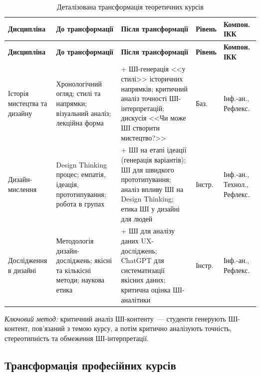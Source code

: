 \begin{longtable}{@{}p{}p{}p{}p{}p{}@{}}
\caption{Деталізована трансформація теоретичних курсів}\label{tab:app-theory} \\
\hline
\textbf{Дисципліна} & \textbf{До трансформації} & \textbf{Після трансформації} & \textbf{Рівень} & \textbf{Компон. ІКК} \\
\hline
\endfirsthead
\hline
\textbf{Дисципліна} & \textbf{До трансформації} & \textbf{Після трансформації} & \textbf{Рівень} & \textbf{Компон. ІКК} \\
\hline
\endhead
Історія мистецтва та дизайну & Хронологічний огляд; стилі та напрямки; візуальний аналіз; лекційна форма & + ШІ-генерація <<у стилі>> історичних напрямків; критичний аналіз точності ШІ-інтерпретацій; дискусія <<Чи може ШІ створити мистецтво?>> & Баз. & Інф.-ан., Рефлекс. \\
\addlinespace
Дизайн-мислення & Design Thinking процес; емпатія, ідеація, прототипування; робота в групах & + ШІ на етапі ідеації (генерація варіантів); ШІ для швидкого прототипування; аналіз впливу ШІ на Design Thinking; етика ШІ у дизайні для людей & Інстр. & Інф.-ан., Технол., Рефлекс. \\
\addlinespace
Дослідження в дизайні & Методологія дизайн-досліджень; якісні та кількісні методи; наукова етика & + ШІ для аналізу даних UX-досліджень; ChatGPT для систематизації якісних даних; критична оцінка ШІ-аналітики & Інстр. & Інф.-ан., Рефлекс. \\
\hline
\end{longtable}

\textit{Ключовий метод:} критичний аналіз ШІ-контенту~--- студенти генерують ШІ-контент, пов'язаний з темою курсу, а потім критично аналізують точність, стереотипність та обмеження ШІ-інтерпретації.

\subsection{Трансформація професійних курсів}

